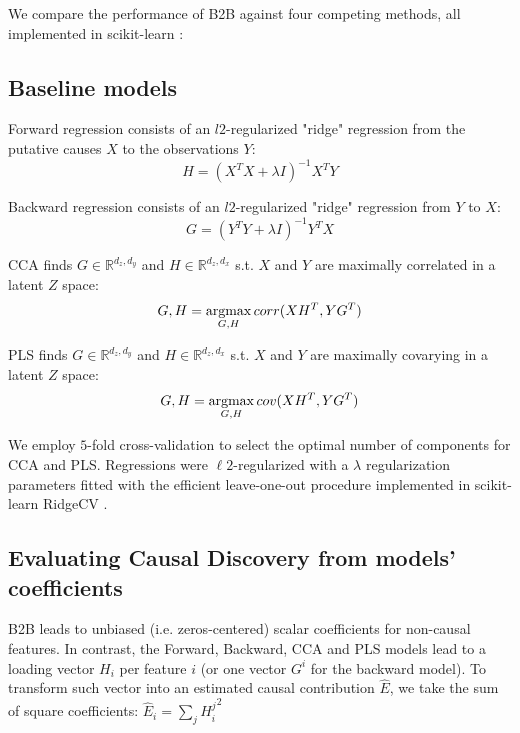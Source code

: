 We compare the performance of B2B against four competing methods, all
implemented in scikit-learn \citep{sklearn}:
%

\subsection{Baseline models}

Forward regression consists of an $l2$-regularized "ridge" regression from the
putative causes $X$ to the observations $Y$: \begin{equation} H = (X^T X
+\lambda I)^{-1} X^T Y \end{equation}

Backward regression consists of an $l2$-regularized "ridge" regression from $Y$
to $X$: \begin{equation} G = (Y^T Y +\lambda I)^{-1} Y^T X \end{equation}

CCA finds $G\in\mathbb{R}^{d_z, d_y}$ and $H\in\mathbb{R}^{d_z, d_x}$
s.t.
$X$ and $Y$ are maximally correlated in a latent $Z$ space:
\begin{equation} G,H = \operatorname*{argmax}_{G,H} corr(XH^T, YG^T) \end{equation}

PLS finds $G\in\mathbb{R}^{d_z, d_y}$ and $H\in\mathbb{R}^{d_z, d_x}$
s.t.
$X$ and $Y$ are maximally covarying in a latent $Z$ space:
\begin{equation} G,H = \operatorname*{argmax}_{G,H} cov(XH^T, YG^T) \end{equation}

We employ $5$-fold cross-validation to select the optimal number of components
for CCA and PLS. Regressions were $\ell2$-regularized with a $\lambda$ regularization
parameters fitted with the efficient leave-one-out procedure implemented in
scikit-learn RidgeCV \citep{sklearn}.

\subsection{Evaluating Causal Discovery from models' coefficients}

B2B leads to unbiased (i.e. zeros-centered) scalar coefficients for non-causal
features. In contrast, the Forward, Backward, CCA and PLS models lead to a
loading vector $H_i$ per feature $i$ (or one vector $G^i$ for the backward
model). To transform such vector into an estimated causal contribution $\hat E$,
we take the sum of square coefficients:
  $\hat E_i = \sum_j {H^j_i}^2 $

